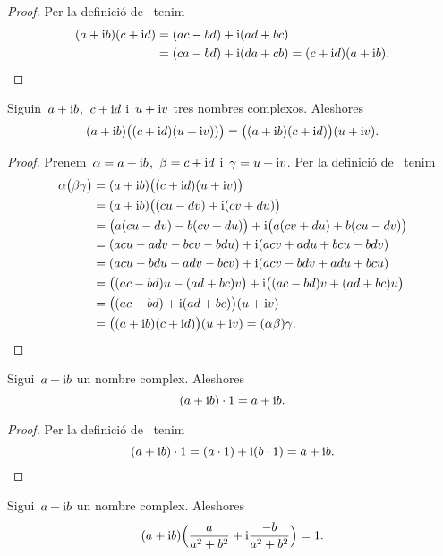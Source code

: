 \documentclass[../Apunts.tex]{subfiles}
\begin{document}
	\begin{proof}
		Per la definició de~ tenim
		\begin{align*}
			(a+\mathrm{i} b)(c+\mathrm{i} d)&=(ac-bd)+\mathrm{i}(ad+bc) \\
			&=(ca-bd)+\mathrm{i}(da+cb)=(c+\mathrm{i} d)(a+\mathrm{i} b).\qedhere
		\end{align*}
	\end{proof}
	\begin{proposition}
		\label{prop:els nombres complexos són associatius pel producte}
		Siguin~\(a+\mathrm{i} b\),~\(c+\mathrm{i} d\) i~\(u+\mathrm{i} v\) tres nombres complexos. Aleshores
		\[(a+\mathrm{i} b)\big((c+\mathrm{i} d)(u+\mathrm{i} v))\big)=\big((a+\mathrm{i} b)(c+\mathrm{i} d)\big)(u+\mathrm{i} v).\]
	\end{proposition}
	\begin{proof}
		Prenem~\(\alpha=a+\mathrm{i} b\),~\(\beta=c+\mathrm{i} d\) i~\(\gamma=u+\mathrm{i} v\). Per la definició de~ tenim
		\begin{align*}
			\alpha\big(\beta\gamma\big)&=(a+\mathrm{i} b)\big((c+\mathrm{i} d)(u+\mathrm{i} v)\big) \\
			&=(a+\mathrm{i} b)\big((cu-dv)+\mathrm{i}(cv+du)\big) \\
			&=\big(a(cu-dv)-b(cv+du)\big)+\mathrm{i}\big(a(cv+du)+b(cu-dv)\big) \\
			&=(acu-adv-bcv-bdu)+\mathrm{i}(acv+adu+bcu-bdv) \\
			&=(acu-bdu-adv-bcv)+\mathrm{i}(acv-bdv+adu+bcu) \\
			&=\big((ac-bd)u-(ad+bc)v\big)+\mathrm{i}\big((ac-bd)v+(ad+bc)u\big) \\
			&=\big((ac-bd)+\mathrm{i}(ad+bc)\big)(u+\mathrm{i} v) \\
			&=\big((a+\mathrm{i} b)(c+\mathrm{i} d)\big)(u+\mathrm{i} v)=(\alpha\beta)\gamma.\qedhere
		\end{align*}
	\end{proof}
	\begin{proposition}
		\label{prop:element neutre pel producte dels complexos}
		Sigui~\(a+\mathrm{i} b\) un nombre complex. Aleshores
		\[(a+\mathrm{i} b)\cdot1=a+\mathrm{i} b.\]
	\end{proposition}
	\begin{proof}
		Per la definició de~ tenim
		\[(a+\mathrm{i} b)\cdot1=(a\cdot1)+\mathrm{i}(b\cdot1)=a+\mathrm{i} b.\qedhere\]
	\end{proof}
	\begin{proposition}
		\label{prop:element invers pel producte de nombres complexos}
		Sigui~\(a+\mathrm{i} b\) un nombre complex. Aleshores
		\[(a+\mathrm{i} b)\Big(\frac{a}{a^{2}+b^{2}}+\mathrm{i}\frac{-b}{a^{2}+b^{2}}\Big)=1.\]
	\end{proposition}
\end{document}
